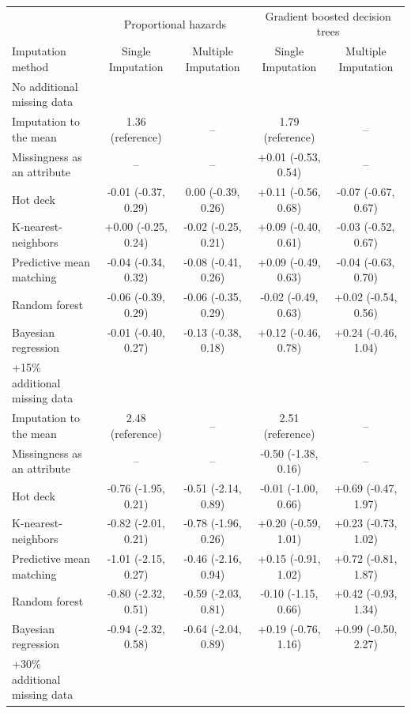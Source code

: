 \documentclass{article}
\begin{document}
\begin{table}
\begin{tabular}{lcccc}
\toprule
& \multicolumn{2}{c}{Proportional hazards} & \multicolumn{2}{c}{Gradient boosted decision trees} \\ 
 \cmidrule(lr){2-3}\cmidrule(lr){4-5}
Imputation method & Single Imputation & Multiple Imputation & Single Imputation & Multiple Imputation \\ 
\midrule
\multicolumn{1}{l}{No additional missing data} \\ 
\midrule
Imputation to the mean & 1.36 (reference) & -- & 1.79 (reference) & -- \\ 
Missingness as an attribute & -- & -- & +0.01 (-0.53, 0.54) & -- \\ 
Hot deck & -0.01 (-0.37, 0.29) & 0.00 (-0.39, 0.26) & +0.11 (-0.56, 0.68) & -0.07 (-0.67, 0.67) \\ 
K-nearest-neighbors & +0.00 (-0.25, 0.24) & -0.02 (-0.25, 0.21) & +0.09 (-0.40, 0.61) & -0.03 (-0.52, 0.67) \\ 
Predictive mean matching & -0.04 (-0.34, 0.32) & -0.08 (-0.41, 0.26) & +0.09 (-0.49, 0.63) & -0.04 (-0.63, 0.70) \\ 
Random forest & -0.06 (-0.39, 0.29) & -0.06 (-0.35, 0.29) & -0.02 (-0.49, 0.63) & +0.02 (-0.54, 0.56) \\ 
Bayesian regression & -0.01 (-0.40, 0.27) & -0.13 (-0.38, 0.18) & +0.12 (-0.46, 0.78) & +0.24 (-0.46, 1.04) \\ 
\midrule
\multicolumn{1}{l}{+15\% additional missing data} \\ 
\midrule
Imputation to the mean & 2.48 (reference) & -- & 2.51 (reference) & -- \\ 
Missingness as an attribute & -- & -- & -0.50 (-1.38, 0.16) & -- \\ 
Hot deck & -0.76 (-1.95, 0.21) & -0.51 (-2.14, 0.89) & -0.01 (-1.00, 0.66) & +0.69 (-0.47, 1.97) \\ 
K-nearest-neighbors & -0.82 (-2.01, 0.21) & -0.78 (-1.96, 0.26) & +0.20 (-0.59, 1.01) & +0.23 (-0.73, 1.02) \\ 
Predictive mean matching & -1.01 (-2.15, 0.27) & -0.46 (-2.16, 0.94) & +0.15 (-0.91, 1.02) & +0.72 (-0.81, 1.87) \\ 
Random forest & -0.80 (-2.32, 0.51) & -0.59 (-2.03, 0.81) & -0.10 (-1.15, 0.66) & +0.42 (-0.93, 1.34) \\ 
Bayesian regression & -0.94 (-2.32, 0.58) & -0.64 (-2.04, 0.89) & +0.19 (-0.76, 1.16) & +0.99 (-0.50, 2.27) \\ 
\midrule
\multicolumn{1}{l}{+30\% additional missing data} \\ 

\end{tabular}
\end{table}
\end{document}
